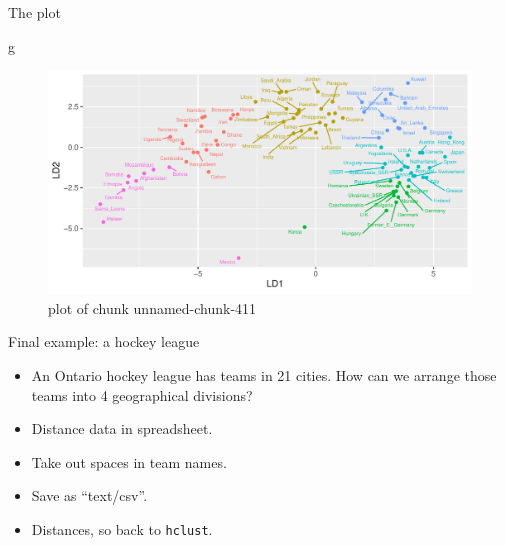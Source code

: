 \documentclass[ignorenonframetext,]{beamer}
\newenvironment{Shaded}{\begin{snugshade}}{\end{snugshade}}
\newcommand{\NormalTok}[1]{#1}
\begin{document}
\begin{frame}[fragile]{The plot}
\protect\hypertarget{the-plot-7}{}

\begin{Shaded}
\begin{Highlighting}[]
\NormalTok{g}
\end{Highlighting}
\end{Shaded}

\begin{figure}
\centering
\includegraphics{figure/unnamed-chunk-411-1.pdf}
\caption{plot of chunk unnamed-chunk-411}
\end{figure}

\end{frame}

\begin{frame}[fragile]{Final example: a hockey league}
\protect\hypertarget{final-example-a-hockey-league}{}

\begin{itemize}
\item
  An Ontario hockey league has teams in 21 cities. How can we arrange
  those teams into 4 geographical divisions?
\item
  Distance data in spreadsheet.
\item
  Take out spaces in team names.
\item
  Save as ``text/csv''.
\item
  Distances, so back to \texttt{hclust}.
\end{itemize}

\end{frame}
\end{document}

